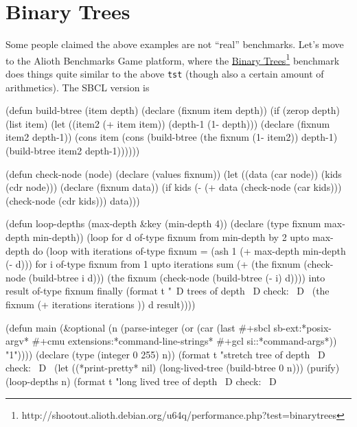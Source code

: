 \section{Binary Trees}
\label{sec:need-speed-binary-trees}

Some people claimed the above examples are not ``real'' benchmarks. Let's move to
the Alioth Benchmarks Game platform, where the
\underline{Binary Trees}\footnote{http://shootout.alioth.debian.org/u64q/performance.php?test=binarytrees} benchmark does things quite similar to the above \texttt{tst} (though also a
certain amount of arithmetics). The SBCL version is
\begin{wideverbatim}
   (defun build-btree (item depth)
     (declare (fixnum item depth))
     (if (zerop depth) (list item)
         (let ((item2 (+ item item))
               (depth-1 (1- depth)))
           (declare (fixnum item2 depth-1))
           (cons item
               (cons (build-btree (the fixnum (1- item2)) depth-1)
                    (build-btree item2 depth-1))))))

   (defun check-node (node)
     (declare (values fixnum))
     (let ((data (car node))
           (kids (cdr node)))
       (declare (fixnum data))
       (if kids
           (- (+ data (check-node (car kids)))
              (check-node (cdr kids)))
           data)))

   (defun loop-depths (max-depth &key (min-depth 4))
     (declare (type fixnum max-depth min-depth))
     (loop for d of-type fixnum from min-depth by 2 upto max-depth do
          (loop with iterations of-type fixnum = (ash 1 (+ max-depth min-depth (- d)))
             for i of-type fixnum from 1 upto iterations
             sum (+ (the fixnum (check-node (build-btree i d)))
                    (the fixnum (check-node (build-btree (- i) d))))
             into result of-type fixnum
             finally
               (format t "~D   trees of depth ~D    check: ~D~%
                       (the fixnum (+ iterations iterations )) d result))))

\end{wideverbatim}

\begin{wideverbatim}

   (defun main (&optional (n (parse-integer
                              (or (car (last #+sbcl sb-ext:*posix-argv*
                                             #+cmu  extensions:*command-line-strings*
                                             #+gcl  si::*command-args*))
                                  "1"))))
     (declare (type (integer 0 255) n))
     (format t "stretch tree of depth ~D   check: ~D~%
     (let ((*print-pretty* nil) (long-lived-tree (build-btree 0 n)))
       (purify)
       (loop-depths n)
       (format t "long lived tree of depth ~D    check: ~D~%
\end{wideverbatim}

